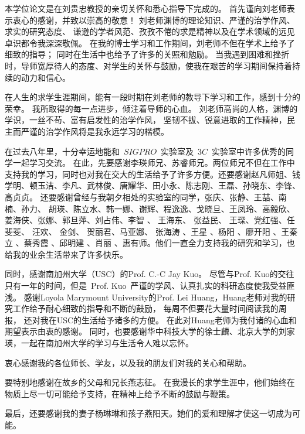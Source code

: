 \par 本学位论文是在刘贵忠教授的亲切关怀和悉心指导下完成的。 首先谨向刘老师表示衷心的感谢，并致以崇高的敬意！
刘老师渊博的理论知识、严谨的治学作风、求实的研究态度、
谦逊的学者风范、孜孜不倦的求是精神以及在学术领域的远见卓识都令我深深敬佩。
在我的博士学习和工作期间，刘老师不但在学术上给予了细致的指导； 同时在生活中也给予了许多的关照和勉励。
当我遇到困难和挫折时，导师宽厚待人的态度、对学生的关怀与鼓励，使我在艰苦的学习期间保持着持续的动力和信心。

在人生的求学生涯期间，能有一段时期在刘老师的教导下学习和工作，感到十分的荣幸。
我所取得的每一点进步，倾注着导师的心血。
刘老师高尚的人格，渊博的学识，一丝不苟、富有启发性的治学作风，
坚韧不拔、锐意进取的工作精神，民主而严谨的治学作风将是我永远学习的楷模。

\par 在过去八年里，十分幸运地能和~$SIGPRO$~实验室及~$3C$~实验室中许多优秀的同学一起学习交流。
在此，先要感谢李瑛师兄、苏睿师兄。两位师兄不但在工作中支持我的学习，同时也对我在交大的生活给予了许多方便。还要感谢赵凡师姐、钱学明、顿玉洁、李凡、武林俊、唐耀华、田小永、陈志刚、王磊、孙晓东、李锋、高贞贞。
还要感谢曾经与我朝夕相处的实验室的同学，张庆、张静、王喆、南楠、孙力、 胡瑛、陈立水、韩一娜、谢辉、程逸逸、戈晓旦、王凤玲、高毅欣、姜海侠、张娜、郭旦萍、刘占伟、李智 、 王海东、 张益民、 王琛、党红强、任斐斐、 汪欢、 金剑、 贺丽君、马亚娜、 张海涛 、王星 、杨阳 、廖开阳 、王秦立 、蔡秀霞 、邱明建 、肖丽 、惠有师。他们一直全力支持我的研究和学习，也给我的业余生活带来了许多快乐。

\par 同时，感谢南加州大学（USC）的Prof. C.-C Jay Kuo。
尽管与Prof. Kuo的交往只有一年的时间，但是~Prof. Kuo~严谨的学风、认真扎实的科研态度使我受益匪浅。
感谢Loyola Marymount University的Prof. Lei Huang，Huang老师对我的研究工作给予耐心细致的指导和不断的鼓励，
每周不但要花大量时间阅读我的周报，
还对我在USC的生活给予诸多的方便。
在此对Huang老师为我付诸的心血和期望表示由衷的感谢。
同时，也要感谢华中科技大学的徐士麟、北京大学的刘家瑛，一起在南加州大学的学习与生活令人难以忘怀。

\par 衷心感谢我的各位师长、学友，以及我的朋友们对我的关心和帮助。 
\par 要特别地感谢在故乡的父母和兄长燕志征。 在我漫长的求学生涯中，他们始终在物质上尽一切可能给予支持，在精神上给予不断的鼓励与鞭策。

\par 最后，还要感谢我的妻子杨琳琳和孩子燕阳天。她们的爱和理解才使这一切成为可能。
